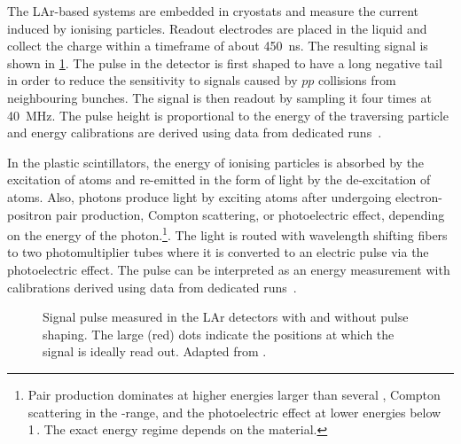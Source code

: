 The LAr-based systems are embedded in cryostats and measure the current induced by ionising particles. Readout electrodes are placed in the liquid and collect the charge within a timeframe of about \SI{450}{\nano\second}. The resulting signal is shown in \cref{fig:LAr-signal-pulse}. The pulse in the detector is first shaped to have a long negative tail in order to reduce the sensitivity to signals caused by $pp$ collisions from neighbouring bunches. The signal is then readout by sampling it four times at \SI{40}{\mega\hertz}. The pulse height is proportional to the energy of the traversing particle and energy calibrations are derived using data from dedicated runs~\cite{Abreu:1303004}.

In the plastic scintillators, the energy of ionising particles is absorbed by the excitation of atoms and re-emitted in the form of light by the de-excitation of atoms. Also, photons produce light by exciting atoms after undergoing electron-positron pair production, Compton scattering, or photoelectric effect, depending on the energy of the photon.\footnote{Pair production dominates at higher energies larger than several \MeV, Compton scattering in the \MeV-range, and the photoelectric effect at lower energies below 1\,\MeV. The exact energy regime depends on the material.}.
The light is routed with wavelength shifting fibers to two photomultiplier tubes where it is converted to an electric pulse via the photoelectric effect. The pulse can be interpreted as an energy measurement with calibrations derived using data from dedicated runs~\cite{PERF-2007-01}.

\FloatBarrier
\begin{figure}[t]
    \caption{Signal pulse measured in the LAr detectors with and without pulse shaping. The large (red) dots indicate the positions at which the signal is ideally read out. Adapted from .}
    \label{fig:LAr-signal-pulse}
\end{figure}



